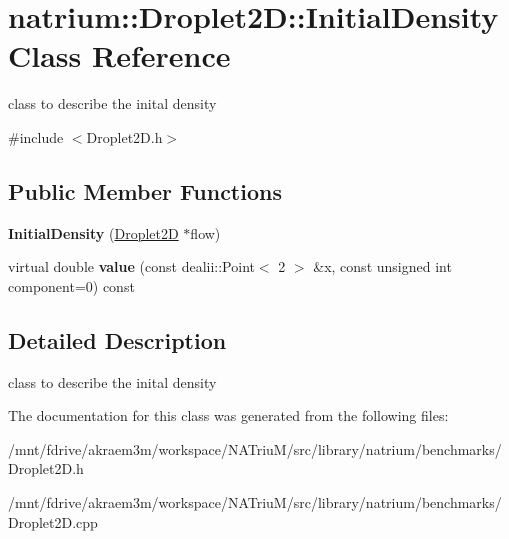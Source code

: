 \hypertarget{classnatrium_1_1Droplet2D_1_1InitialDensity}{
\section{natrium::Droplet2D::InitialDensity Class Reference}
\label{classnatrium_1_1Droplet2D_1_1InitialDensity}
}


class to describe the inital density  


{\ttfamily \#include $<$Droplet2D.h$>$}\subsection*{Public Member Functions}
\begin{DoxyCompactItemize}
\item 
\hypertarget{classnatrium_1_1Droplet2D_1_1InitialDensity_ac1bbe2881878eff19ba1b911ce7661ff}{
{\bfseries InitialDensity} (\hyperlink{classnatrium_1_1Droplet2D}{Droplet2D} $\ast$flow)}
\label{classnatrium_1_1Droplet2D_1_1InitialDensity_ac1bbe2881878eff19ba1b911ce7661ff}

\item 
\hypertarget{classnatrium_1_1Droplet2D_1_1InitialDensity_a3f582bfd70880e21b00846ff3589a251}{
virtual double {\bfseries value} (const dealii::Point$<$ 2 $>$ \&x, const unsigned int component=0) const }
\label{classnatrium_1_1Droplet2D_1_1InitialDensity_a3f582bfd70880e21b00846ff3589a251}

\end{DoxyCompactItemize}


\subsection{Detailed Description}
class to describe the inital density 

The documentation for this class was generated from the following files:\begin{DoxyCompactItemize}
\item 
/mnt/fdrive/akraem3m/workspace/NATriuM/src/library/natrium/benchmarks/Droplet2D.h\item 
/mnt/fdrive/akraem3m/workspace/NATriuM/src/library/natrium/benchmarks/Droplet2D.cpp\end{DoxyCompactItemize}
